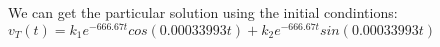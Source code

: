 \documentclass[preview]{standalone}
\begin{document}
\begin{center}
We can get the particular solution using the initial condintions:
                                $v_T(t) = k_1e^{-666.67t}cos(0.00033993 t) + k_2e^{-666.67t}sin(0.00033993t)$
\end{center}
\end{document}
